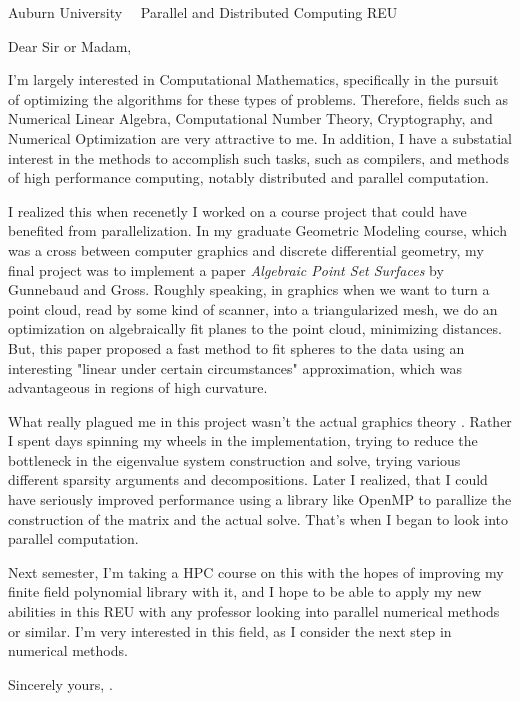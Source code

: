 \documentclass{scrlttr2}
\renewcommand{\\}{\ {\large\textperiodcentered}\ }
\begin{document}

\begin{letter}{ %
Auburn University\\
Parallel and Distributed Computing REU
}

\opening{Dear Sir or Madam,}

I'm largely interested in Computational Mathematics, specifically in the pursuit
of optimizing the algorithms for these types of problems. Therefore, fields such
as Numerical Linear Algebra, Computational Number Theory, Cryptography,
and Numerical Optimization are very attractive to me. In addition, I have a
substatial interest in the methods to accomplish such tasks, such as compilers,
and methods of high performance computing, notably distributed and parallel
computation.

I realized this when recenetly I worked on a course project that could have
benefited from parallelization. In my graduate Geometric Modeling course, which
was a cross between computer graphics and discrete differential geometry, my
final project was to implement a paper \textit{Algebraic Point Set Surfaces} by
Gunnebaud and Gross. Roughly speaking, in graphics when we want to turn a point
cloud, read by some kind of scanner, into a triangularized mesh, we do an
optimization on algebraically fit planes to the point cloud, minimizing
distances. But, this paper proposed a fast method to fit spheres to the data
using an interesting "linear under certain circumstances" approximation, which
was advantageous in regions of high curvature. 

What really plagued me in this project wasn't the actual graphics theory .
Rather I spent days spinning my wheels in the implementation, trying to reduce
the bottleneck in the eigenvalue system construction and solve, trying various
different sparsity arguments and decompositions. Later I realized, that I could
have seriously improved performance using a library like OpenMP to parallize the
construction of the matrix and the actual solve. That's when I began to look
into parallel computation. 

Next semester, I'm taking a HPC course on this with the hopes of improving my
finite field polynomial library with it, and I hope to be able to apply my
new abilities in this REU with any professor looking into parallel numerical
methods or similar. I'm very interested in this field, as I consider the next
step in numerical methods.

Sincerely yours, .


\end{letter}
\end{document}
